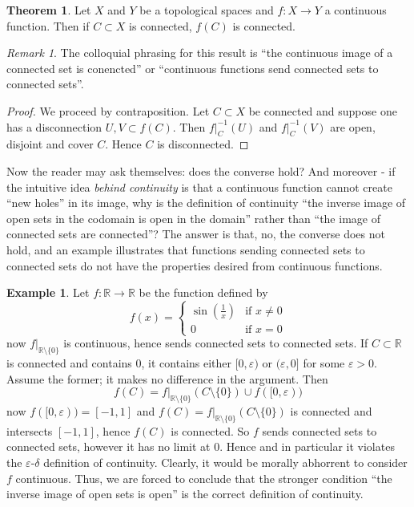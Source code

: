 \documentclass{book}
\theoremstyle{definition}
\newtheorem{theorem}{Theorem}[section]
\newtheorem{example}{Example}[section]
\theoremstyle{remark}
\newtheorem{remark}{Remark}[section]
\newcommand{\R}{\mathbb{R}}
\begin{document}
\begin{theorem}
Let $X$ and $Y$ be a topological spaces and $f:X\to Y$ a continuous function. Then if $C\subset X$ is connected, $f(C)$ is connected. 
\end{theorem}
\begin{remark}
The colloquial phrasing for this result is ``the continuous image of a connected set is conencted'' or ``continuous functions send connected sets to connected sets''.
\end{remark}
\begin{proof}
We proceed by contraposition. Let $C\subset X$ be connected and suppose one has a disconnection $U,V\subset f(C)$. Then $f|_C^{-1}(U)$ and $f|_C^{-1}(V)$ are open, disjoint and cover $C$. Hence $C$ is disconnected.
\end{proof}

Now the reader may ask themselves: does the converse hold? And moreover - if the intuitive idea \textit{behind continuity} is that a continuous function cannot create ``new holes'' in its image, why is the definition of continuity ``the inverse image of open sets in the codomain is open in the domain'' rather than ``the image of connected sets are connected''? The answer is that, no, the converse does not hold, and an example illustrates that functions sending connected sets to connected sets do not have the properties desired from continuous functions.

\begin{example}
Let $f:\R\to\R$ be the function defined by
$$f(x)=\begin{cases}\sin\left(\tfrac{1}{x}\right) & \text{if }x\neq 0\\0 & \text{if }x=0\end{cases}$$
now $f|_{\R\setminus\{0\}}$ is continuous, hence sends connected sets to connected sets. If $C\subset\R$ is connected and contains 0, it contains either $[0,\varepsilon)$ or $(\varepsilon,0]$ for some $\varepsilon>0$. Assume the former; it makes no difference in the argument. Then
$$f(C)=f|_{\R\setminus\{0\}}(C\setminus\{0\})\cup f([0,\varepsilon))$$
now $f([0,\varepsilon))=[-1,1]$ and $f(C)=f|_{\R\setminus\{0\}}(C\setminus\{0\})$ is connected and intersects $[-1,1]$, hence $f(C)$ is connected. So $f$ sends connected sets to connected sets, however it has no limit at 0. Hence and in particular it violates the $\varepsilon$-$\delta$ definition of continuity. Clearly, it would be morally abhorrent to consider $f$ continuous. Thus, we are forced to conclude that the stronger condition ``the inverse image of open sets is open'' is the correct definition of continuity.
\end{example}
\end{document}
